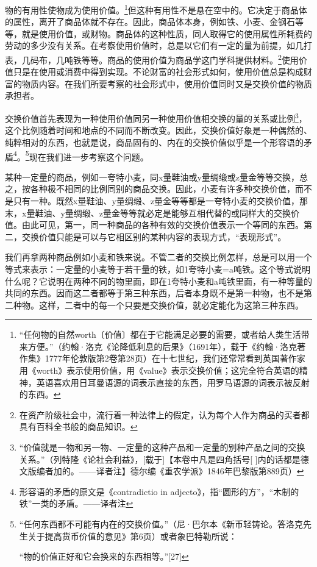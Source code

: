 \documentclass{ctexbook}
\begin{document}
    物的有用性使物成为使用价值。\footnote{“任何物的自然worth〔价值〕都在于它能满足必要的需要，或者给人类生活带来方便。”（约翰·洛克《论降低利息的后果》（1691年），载于《约翰·洛克著作集》1777年伦敦版第2卷第28页）在十七世纪，我们还常常看到英国著作家用《worth》表示使用价值，用《value》表示交换价值；这完全符合英语的精神，英语喜欢用日耳曼语源的词表示直接的东西，用罗马语源的词表示被反射的东西。}但这种有用性不是悬在空中的。它决定于商品体的属性，离开了商品体就不存在。因此，商品体本身，例如铁、小麦、金钢石等等，就是使用价值，或财物。商品体的这种性质，同人取得它的使用属性所耗费的劳动的多少没有关系。在考察使用价值时，总是以它们有一定的量为前提，如几打表，几码布，几吨铁等等。商品的使用价值为商品学这门学科提供材料。\footnote{在资产阶级社会中，流行着一种法律上的假定，认为每个人作为商品的买者都具有百科全书般的商品知识。}使用价值只是在使用或消费中得到实现。不论财富的社会形式如何，使用价值总是构成财富的物质内容。在我们所要考察的社会形式中，使用价值同时又是交换价值的物质承担者。

    交换价值首先表现为一种使用价值同另一种使用价值相交换的量的关系或比例\footnote{“价值就是一物和另一物、一定量的这种产品和一定量的别种产品之间的交换关系。”（列特隆《论社会利益》，[载于]【本卷中凡是四角括号[ ]内的话都是德文版编者加的。——译者注】德尔编《重农学派》1846年巴黎版第889页）}，这个比例随着时间和地点的不同而不断改变。因此，交换价值好象是一种偶然的、纯粹相对的东西，也就是说，商品固有的、内在的交换价值似乎是一个形容语的矛盾\footnote{形容语的矛盾的原文是《contradictio in adjecto》，指“圆形的方”，“木制的铁”一类的矛盾。——译者注}。\footnote{“任何东西都不可能有内在的交换价值。”（尼·巴尔本《新币轻铸论。答洛克先生关于提高货币价值的意见》第6页）或者象巴特勒所说： %

    “物的价值正好和它会换来的东西相等。”[27]}现在我们进一步考察这个问题。

    某种一定量的商品，例如一夸特小麦，同x量鞋油或y量绸缎或z量金等等交换，总之，按各种极不相同的比例同别的商品交换。因此，小麦有许多种交换价值，而不是只有一种。既然x量鞋油、y量绸缎、z量金等等都是一夸特小麦的交换价值，那末，x量鞋油、y量绸缎、z量金等等就必定是能够互相代替的或同样大的交换价值。由此可见，第一，同一种商品的各种有效的交换价值表示一个等同的东西。第二，交换价值只能是可以与它相区别的某种内容的表现方式，“表现形式”。

    我们再拿两种商品例如小麦和铁来说。不管二者的交换比例怎样，总是可以用一个等式来表示：一定量的小麦等于若干量的铁，如1夸特小麦=a吨铁。这个等式说明什么呢？它说明在两种不同的物里面，即在1夸特小麦和a吨铁里面，有一种等量的共同的东西。因而这二者都等于第三种东西，后者本身既不是第一种物，也不是第二种物。这样，二者中的每一个只要是交换价值，就必定能化为这第三种东西。
\end{document}
